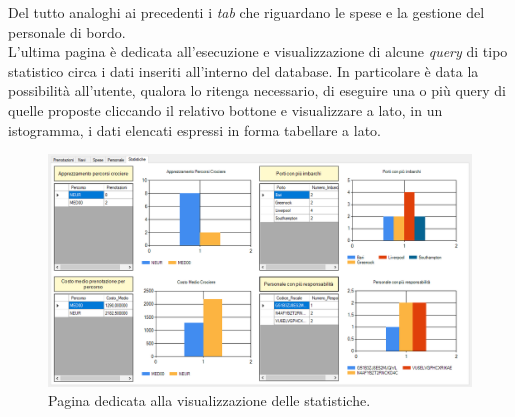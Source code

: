 \documentclass[a4paper, titlepage]{report}
\begin{document}
\noindent
Del tutto analoghi ai precedenti i \textit{tab} che riguardano le spese e la gestione del personale di bordo. \\

\noindent
L'ultima pagina è dedicata all'esecuzione e visualizzazione di alcune \textit{query} di tipo statistico circa i dati inseriti all'interno del database. In particolare è data la possibilità all'utente, qualora lo ritenga necessario, di eseguire una o più query di quelle proposte cliccando il relativo bottone e visualizzare a lato, in un istogramma, i dati elencati espressi in forma tabellare a lato.

\begin{figure}[h]
\centering{}
\includegraphics[width=\textwidth]{images/screen-stats.PNG}
\caption{Pagina dedicata alla visualizzazione delle statistiche.}
\label{img:screen-stats}
\end{figure}
\end{document}
